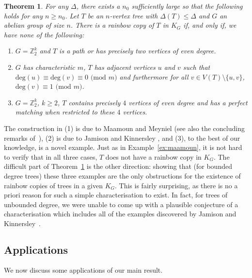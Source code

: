 \documentclass[a4paper,11pt,hidelinks]{amsart}
\newtheorem{theorem}{Theorem}[section]
\theoremstyle{definition}
\begin{document}
\begin{theorem}\label{Theorem_main_intro} For any $\Delta$, there exists a $n_0$ sufficiently large so that the following holds for any $n\geq n_0$. Let $T$ be an $n$-vertex tree with $\Delta(T)\leq \Delta$ and $G$ an abelian group of size $n$. There is a rainbow copy of $T$ in $K_G$ if, and only if, we have none of the following:
\begin{enumerate}[(1)]
\item $G=\mathbb{Z}_2^k$ and  $T$ is a path or has precisely two vertices of even degree.
\item $G$ has characteristic $m$, $T$ has adjacent vertices $u$ and $v$ such that $\mathrm{deg}(u)\equiv \mathrm{deg}(v)\equiv 0 $ $(\mathrm{mod}$ $m)$ and furthermore for all $v\in V(T)\setminus\{u,v\}$, $\mathrm{deg}(v)\equiv 1 $ $(\mathrm{mod}$ $m)$.
\item $G=\mathbb{Z}_2^k$, $k\geq 2$, $T$ contains precisely $4$ vertices of  even degree and has a perfect matching when restricted to these $4$ vertices.
\end{enumerate}
\end{theorem}
The construction in (1)  is due to Maamoun and Meyniel \cite{maamoun1984problem} (see also the concluding remarks of~\cite{benzing2020long}), (2) is due to Jamison and Kinnersley \cite{jamison2022rainbow}, and (3), to the best of our knowledge, is a novel example. Just as in Example~\ref{ex:maamoun}, it is not hard to verify that in all three cases, $T$ does not have a rainbow copy in $K_G$. The difficult part of Theorem~\ref{Theorem_main_intro} is the other direction: showing that (for bounded degree trees) these three examples are the only obstructions for the existence of rainbow copies of trees in a given $K_G$. This is fairly surprising, as there is no a priori reason for such a simple characterisation to exist. In fact, for trees of unbounded degree, we were unable to come up with a plausible conjecture of a characterisation which includes all of the examples discovered by Jamison and Kinnersley~\cite{jamison2022rainbow}.
\subsection{Applications}
We now discuss some applications of our main result.
\end{document}
